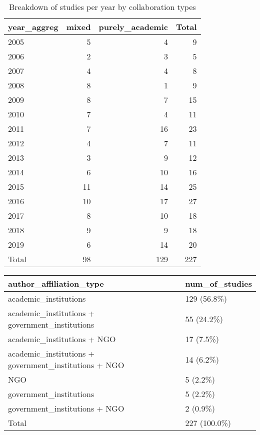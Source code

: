 \documentclass[
]{article}
\begin{document}
\begin{table}

\caption{\label{tab:unnamed-chunk-7}Breakdown of studies per year by collaboration types}
\centering
\begin{tabular}[t]{lrrr}
\toprule
year\_aggreg & mixed & purely\_academic & Total\\
\midrule
2005 & 5 & 4 & 9\\
 
2006 & 2 & 3 & 5\\
 
2007 & 4 & 4 & 8\\
 
2008 & 8 & 1 & 9\\
 
2009 & 8 & 7 & 15\\
 
2010 & 7 & 4 & 11\\
 
2011 & 7 & 16 & 23\\
 
2012 & 4 & 7 & 11\\
 
2013 & 3 & 9 & 12\\
 
2014 & 6 & 10 & 16\\
 
2015 & 11 & 14 & 25\\
 
2016 & 10 & 17 & 27\\
 
2017 & 8 & 10 & 18\\
 
2018 & 9 & 9 & 18\\
 
2019 & 6 & 14 & 20\\
 
Total & 98 & 129 & 227\\
 \bottomrule
\end{tabular}
\end{table}

\begin{tabular}{ll}
\toprule 
author\_affiliation\_type & num\_of\_studies\\
 \midrule
academic\_institutions & 129  (56.8\%)\\
academic\_institutions + government\_institutions & 55  (24.2\%)\\
academic\_institutions + NGO & 17   (7.5\%)\\
academic\_institutions + government\_institutions + NGO & 14   (6.2\%)\\
NGO & 5   (2.2\%)\\
government\_institutions & 5   (2.2\%)\\
government\_institutions + NGO & 2   (0.9\%)\\
Total & 227 (100.0\%)\\
\bottomrule
\end{tabular}
\end{document}
